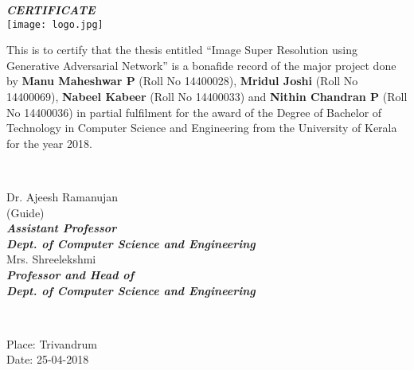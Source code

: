 	\begin{titlepage}
		\begin{centering}
			\textbf{\textit{\LARGE\textsc{{CERTIFICATE}}}}\\[0.5cm]
			\texttt{[image: logo.jpg]}\\

		\end{centering}

		\large{This is to certify that the thesis entitled ``Image Super Resolution using Generative Adversarial Network'' is a bonafide record of the major project done by \textbf{Manu Maheshwar P} (Roll No 14400028), \textbf{Mridul Joshi} (Roll No 14400069), \textbf{Nabeel Kabeer} (Roll No 14400033) and \textbf{Nithin Chandran P} (Roll No 14400036) in partial fulfilment for the award of the Degree of Bachelor of Technology in Computer Science and Engineering from the University of Kerala for the year 2018.}\\[1.5cm]

		\begin{minipage}{0.4\textwidth}
		\begin{flushleft}
		\end{flushleft}
		\end{minipage}
		~
		\begin{minipage}{0.6\textwidth}
		\begin{centering} \large
		\large{Dr. Ajeesh Ramanujan}\\
		\small{(Guide)}\\
		\small{\textit{\textbf{Assistant Professor}}}\\
		\small{\textit{\textbf{Dept. of Computer Science and Engineering}}}\\[1.0cm]

		\large{Mrs. Shreelekshmi}\\
		\small{\textit{\textbf{Professor and Head of}}}\\
		\small{\textit{\textbf{Dept. of Computer Science and Engineering}}}\\
		\end{centering}
		\end{minipage}\\[0.0cm]

		\begin{flushleft}
		Place: Trivandrum\\
		Date:  25-04-2018\\
		\end{flushleft}
		\vfill %
	\end{titlepage}